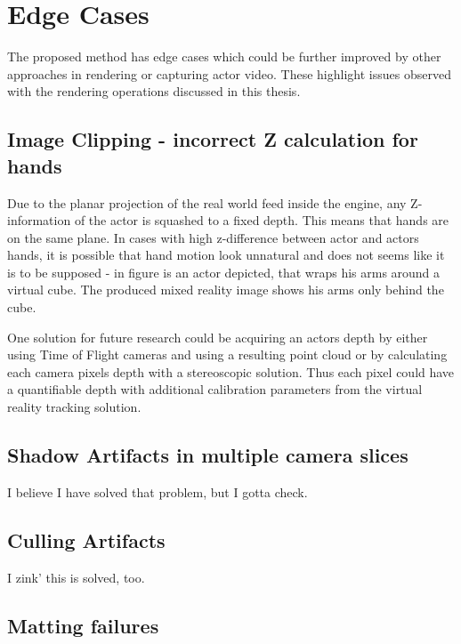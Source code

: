 \section{Edge Cases}

The proposed method has edge cases which could be further improved by other 
approaches in rendering or capturing actor video. These highlight issues 
observed with the rendering operations discussed in this thesis.

\subsection{Image Clipping - incorrect Z calculation for hands}

Due to the planar projection of the real world feed inside the engine, any 
Z-information of the actor is squashed to a fixed depth. This means that hands 
are on the same plane. In cases with high z-difference between actor and actors 
hands, it is possible that hand motion look unnatural and does not seems like 
it is to be supposed - in figure  is an actor depicted, 
that wraps his arms around a virtual cube. The produced mixed reality image 
shows his arms only behind the cube.

One solution for future research could be acquiring an actors depth by either 
using Time of Flight cameras and using a resulting point cloud or by 
calculating each camera pixels depth with a stereoscopic solution. Thus each 
pixel could have a quantifiable depth with additional calibration parameters 
from the virtual reality tracking solution.

\subsection{Shadow Artifacts in multiple camera slices}

I believe I have solved that problem, but I gotta check.

\subsection{Culling Artifacts}

I zink' this is solved, too.

\subsection{Matting failures}

